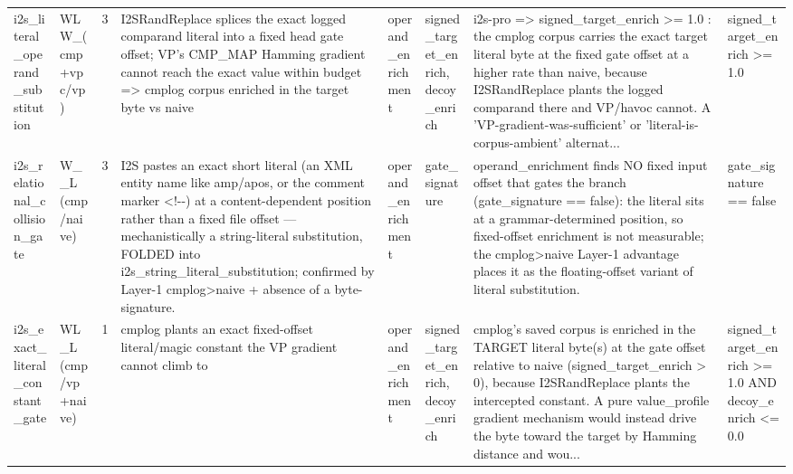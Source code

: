 \documentclass[7pt]{extarticle}
\begin{document}
{\begin{longtable}{@{}p{2.4cm}p{1.9cm}rp{4.3cm}p{1.5cm}p{1.7cm}p{4.6cm}p{3.0cm}@{}}
i2s\_\allowbreak literal\_\allowbreak operand\_\allowbreak substitution & WLW\_\allowbreak  (cmp+vpc/vp) & 3 & I2SRandReplace splices the exact logged comparand literal into a fixed head gate offset; VP's CMP\_\allowbreak MAP Hamming gradient cannot reach the exact value within budget =\textgreater{} cmplog corpus enriched in the target byte vs naive & operand\_\allowbreak enrichment & signed\_\allowbreak target\_\allowbreak enrich, decoy\_\allowbreak enrich & i2s-pro =\textgreater{} signed\_\allowbreak target\_\allowbreak enrich \textgreater{}= 1.0 : the cmplog corpus carries the exact target literal byte at the fixed gate offset at a higher rate than naive, because I2SRandReplace plants the logged comparand there and VP/havoc cannot. A 'VP-gradient-was-sufficient' or 'literal-is-corpus-ambient' alternat... & signed\_\allowbreak target\_\allowbreak enrich \textgreater{}= 1.0\\
i2s\_\allowbreak relational\_\allowbreak collision\_\allowbreak gate & W\_\allowbreak \_\allowbreak L (cmp/naive) & 3 & I2S pastes an exact short literal (an XML entity name like amp/apos, or the comment marker \textless{}!-{}-) at a content-dependent position rather than a fixed file offset --- mechanistically a string-literal substitution, FOLDED into i2s\_\allowbreak string\_\allowbreak literal\_\allowbreak substitution; confirmed by Layer-1 cmplog\textgreater{}naive + absence of a byte-signature. & operand\_\allowbreak enrichment & gate\_\allowbreak signature & operand\_\allowbreak enrichment finds NO fixed input offset that gates the branch (gate\_\allowbreak signature == false): the literal sits at a grammar-determined position, so fixed-offset enrichment is not measurable; the cmplog\textgreater{}naive Layer-1 advantage places it as the floating-offset variant of literal substitution. & gate\_\allowbreak signature == false\\
i2s\_\allowbreak exact\_\allowbreak literal\_\allowbreak constant\_\allowbreak gate & WL\_\allowbreak L (cmp/vp+naive) & 1 & cmplog plants an exact fixed-offset literal/magic constant the VP gradient cannot climb to & operand\_\allowbreak enrichment & signed\_\allowbreak target\_\allowbreak enrich, decoy\_\allowbreak enrich & cmplog's saved corpus is enriched in the TARGET literal byte(s) at the gate offset relative to naive (signed\_\allowbreak target\_\allowbreak enrich \textgreater{} 0), because I2SRandReplace plants the intercepted constant. A pure value\_\allowbreak profile gradient mechanism would instead drive the byte toward the target by Hamming distance and wou... & signed\_\allowbreak target\_\allowbreak enrich \textgreater{}= 1.0 AND decoy\_\allowbreak enrich \textless{}= 0.0\\

\end{longtable}}
\end{document}
